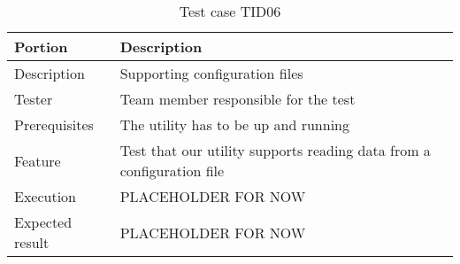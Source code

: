 \begin{table}[ht] \footnotesize \center
\caption{Test case TID06}
\begin{tabularx}{\textwidth}{l X}
	\toprule
	Portion & Description \\
	\midrule
	Description & Supporting configuration files \\
	Tester & Team member responsible for the test \\
	Prerequisites & The utility has to be up and running \\
	Feature & Test that our utility supports reading data from a configuration file \\
	Execution & PLACEHOLDER FOR NOW \\
	Expected result & PLACEHOLDER FOR NOW \\
	\bottomrule
\end{tabularx}
\end{table}

